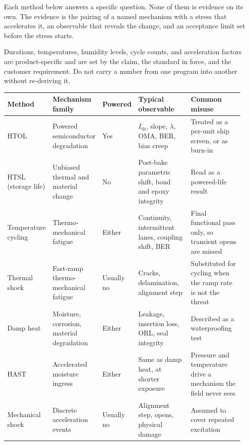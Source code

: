 Each method below answers a specific question. None of them is evidence on its
own. The evidence is the pairing of a named mechanism with a stress that
accelerates it, an observable that reveals the change, and an acceptance limit
set before the stress starts.

Durations, temperatures, humidity levels, cycle counts, and acceleration
factors are product-specific and are set by the claim, the standard in force,
and the customer requirement. Do not carry a number from one program into
another without re-deriving it.

\begin{table}[ht]
\label{tab:stress-method-reference}%
\centering
\setlength{\tabcolsep}{3pt}%
\footnotesize
\renewcommand{\arraystretch}{1.2}%
\begin{tabular}{@{}p{0.15\linewidth}p{0.18\linewidth}p{0.07\linewidth}p{0.28\linewidth}p{0.28\linewidth}@{}}
\toprule
Method & Mechanism family & Powered & Typical observable & Common misuse \\
\midrule
HTOL & Powered semiconductor degradation & Yes & $I_\mathrm{th}$, slope, $\lambda$, OMA, BER, bias creep & Treated as a per-unit ship screen, or as burn-in \\
\addlinespace[0.6em]
HTSL (storage life) & Unbiased thermal and material change & No & Post-bake parametric shift, bond and epoxy integrity & Read as a powered-life result \\
\addlinespace[0.6em]
Temperature cycling & Thermo-mechanical fatigue & Either & Continuity, intermittent lanes, coupling shift, BER & Final functional pass only, so transient opens are missed \\
\addlinespace[0.6em]
Thermal shock & Fast-ramp thermo-mechanical fatigue & Usually no & Cracks, delamination, alignment step & Substituted for cycling when the ramp rate is not the threat \\
\addlinespace[0.6em]
Damp heat & Moisture, corrosion, material degradation & Either & Leakage, insertion loss, ORL, seal integrity & Described as a waterproofing test \\
\addlinespace[0.6em]
HAST & Accelerated moisture ingress & Either & Same as damp heat, at shorter exposure & Pressure and temperature drive a mechanism the field never sees \\
\addlinespace[0.6em]
Mechanical shock & Discrete acceleration events & Usually no & Alignment step, opens, physical damage & Assumed to cover repeated excitation \\

\end{tabular}
\end{table}
